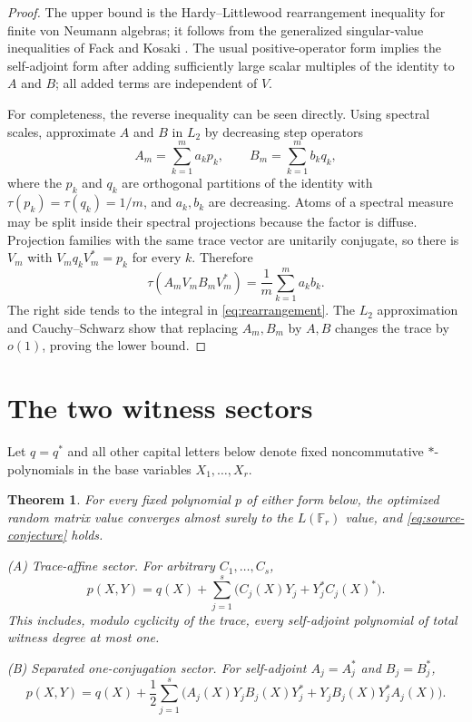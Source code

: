 \documentclass[11pt]{article}
\newtheorem{theorem}{Theorem}
\theoremstyle{remark}
\begin{document}
\begin{proof}
The upper bound is the Hardy--Littlewood rearrangement inequality for finite
von Neumann algebras; it follows from the generalized singular-value
inequalities of Fack and Kosaki \cite{FK}.  The usual positive-operator form
implies the self-adjoint form after adding sufficiently large scalar
multiples of the identity to $A$ and $B$; all added terms are independent of
$V$.

For completeness, the reverse inequality can be seen directly.  Using
spectral scales, approximate $A$ and $B$ in $L_2$ by decreasing step
operators
\[
                 A_m=\sum_{k=1}^m a_kp_k,
       \qquad    B_m=\sum_{k=1}^m b_kq_k,
\]
where the $p_k$ and $q_k$ are orthogonal partitions of the identity with
$\tau(p_k)=\tau(q_k)=1/m$, and $a_k,b_k$ are decreasing.  Atoms of a spectral
measure may be split inside their spectral projections because the factor is
diffuse.  Projection families with the same trace vector are unitarily
conjugate, so there is $V_m$ with $V_mq_kV_m^*=p_k$ for every $k$.  Therefore
\[
             \tau(A_mV_mB_mV_m^*)=\frac1m\sum_{k=1}^ma_kb_k.
\]
The right side tends to the integral in \eqref{eq:rearrangement}.  The
$L_2$ approximation and Cauchy--Schwarz show that replacing $A_m,B_m$ by
$A,B$ changes the trace by $o(1)$, proving the lower bound.
\end{proof}

\section{The two witness sectors}

Let $q=q^*$ and all other capital letters below denote fixed
noncommutative $*$-polynomials in the base variables $X_1,\ldots,X_r$.

\begin{theorem}\label{thm:main}
For every fixed polynomial $p$ of either form below, the optimized random
matrix value converges almost surely to the $L(\mathbb F_r)$ value, and
\eqref{eq:source-conjecture} holds.

\medskip
\noindent\textup{(A) Trace-affine sector.}  For arbitrary $C_1,\ldots,C_s$,
\begin{equation}\label{eq:affine-form}
 p(X,Y)=q(X)+\sum_{j=1}^s
       \big(C_j(X)Y_j+Y_j^*C_j(X)^*\big).
\end{equation}
This includes, modulo cyclicity of the trace, every self-adjoint polynomial
of total witness degree at most one.

\medskip
\noindent\textup{(B) Separated one-conjugation sector.}  For self-adjoint
$A_j=A_j^*$ and $B_j=B_j^*$,
\begin{equation}\label{eq:conj-form}
 p(X,Y)=q(X)+\frac12\sum_{j=1}^s
 \big(A_j(X)Y_jB_j(X)Y_j^*
      +Y_jB_j(X)Y_j^*A_j(X)\big).
\end{equation}
\end{theorem}
\end{document}
